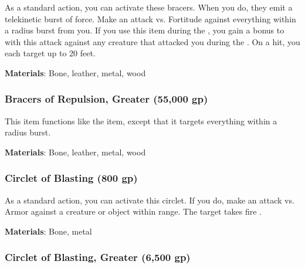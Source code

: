 As a standard action, you can activate these bracers.
When you do, they emit a telekinetic burst of force.
Make an attack vs. Fortitude against everything within a \areasmall radius burst from you.
If you use this item during the ,
you gain a  bonus to  with this attack against any creature that attacked you during the .
On a hit, you  each target up to 20 feet.



\vspace{0.25em}
\textbf{Materials}: Bone, leather, metal, wood


\lowercase{\hypertarget{item:Bracers of Repulsion, Greater}{}}\label{item:Bracers of Repulsion, Greater}
\hypertarget{item:Bracers of Repulsion, Greater}{\subsubsection{Bracers of Repulsion, Greater\hfill{} (55,000 gp)}}

This item functions like the  item, except that it targets everything within a \arealarge radius burst.



\vspace{0.25em}
\textbf{Materials}: Bone, leather, metal, wood


\lowercase{\hypertarget{item:Circlet of Blasting}{}}\label{item:Circlet of Blasting}
\hypertarget{item:Circlet of Blasting}{\subsubsection{Circlet of Blasting\hfill{} (800 gp)}}

As a standard action, you can activate this circlet.
If you do, make an attack vs. Armor against a creature or object within \rngmed range.
\hit The target takes fire .



\vspace{0.25em}
\textbf{Materials}: Bone, metal


\lowercase{\hypertarget{item:Circlet of Blasting, Greater}{}}\label{item:Circlet of Blasting, Greater}
\hypertarget{item:Circlet of Blasting, Greater}{\subsubsection{Circlet of Blasting, Greater\hfill{} (6,500 gp)}}

